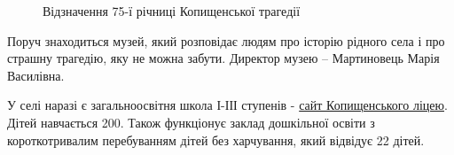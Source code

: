 \begin{figure}
\begin{subfigure}[b]{0.3\textwidth}
		\caption{}
		\label{fig:mouse}
		\end{subfigure}
	\caption{\label{fig:frog4}Відзначення 75-ї річниці Копищенської трагедії}\label{fig:animals}
\end{figure}

Поруч знаходиться музей, який розповідає людям про історію рідного села і про страшну трагедію, яку не можна забути. Директор музею – Мартиновець Марія Василівна.

У селі наразі є загальноосвітня школа І-ІІІ ступенів - \href{https://sites.google.com/kopische.ukr.education/sites/}%
{сайт Копищенського ліцею}.  Дітей навчається 200. Також функціонує заклад дошкільної освіти з короткотривалим перебуванням дітей без харчування, який відвідує 22 дітей.





